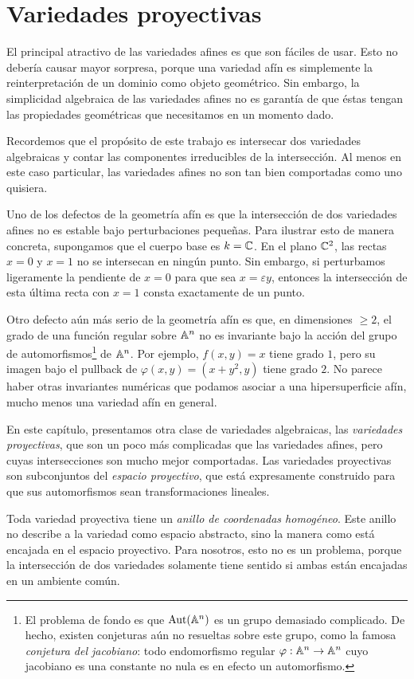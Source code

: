\chapter{Variedades proyectivas}

\noindent El principal atractivo de las variedades afines es que son fáciles de usar. Esto no debería causar mayor sorpresa, porque una variedad afín es simplemente la reinterpretación de un dominio como objeto geométrico. Sin embargo, la simplicidad algebraica de las variedades afines no es garantía de que éstas tengan las propiedades geométricas que necesitamos en un momento dado.

Recordemos que el propósito de este trabajo es intersecar dos variedades algebraicas y contar las componentes irreducibles de la intersección. Al menos en este caso particular, las variedades afines no son tan bien comportadas como uno quisiera.

Uno de los defectos de la geometría afín es que la intersección de dos variedades afines no es estable bajo perturbaciones pequeñas. Para ilustrar esto de manera concreta, supongamos que el cuerpo base es $k = \mathbb C$. En el plano $\mathbb C^2$, las rectas $x = 0$ y $x = 1$ no se intersecan en ningún punto. Sin embargo, si perturbamos ligeramente la pendiente de $x = 0$ para que sea $x = \varepsilon y$, entonces la intersección de esta última recta con $x = 1$ consta exactamente de un punto.

Otro defecto aún más serio de la geometría afín es que, en dimensiones $\ge 2$, el grado de una función regular sobre $\mathbb A^n$ no es invariante bajo la acción del grupo de automorfismos\footnote{El problema de fondo es que $\operatorname{Aut}(\mathbb A^n)$ es un grupo demasiado complicado. De hecho, existen conjeturas aún no resueltas sobre este grupo, como la famosa \textit{conjetura del jacobiano}: todo endomorfismo regular $\varphi : \mathbb A^n \to \mathbb A^n$ cuyo jacobiano es una constante no nula es en efecto un automorfismo.} de $\mathbb A^n$. Por ejemplo, $f(x,y) = x$ tiene grado $1$, pero su imagen bajo el pullback de $\varphi(x,y) = (x + y^2, y)$ tiene grado $2$. No parece haber otras invariantes numéricas que podamos asociar a una hipersuperficie afín, mucho menos una variedad afín en general.

En este capítulo, presentamos otra clase de variedades algebraicas, las \textit{variedades proyectivas}, que son un poco más complicadas que las variedades afines, pero cuyas intersecciones son mucho mejor comportadas. Las variedades proyectivas son subconjuntos del \textit{espacio proyectivo}, que está expresamente construido para que sus automorfismos sean transformaciones lineales.

Toda variedad proyectiva tiene un \textit{anillo de coordenadas homogéneo}. Este anillo no describe a la variedad como espacio abstracto, sino la manera como está encajada en el espacio proyectivo. Para nosotros, esto no es un problema, porque la intersección de dos variedades solamente tiene sentido si ambas están encajadas en un ambiente común.
